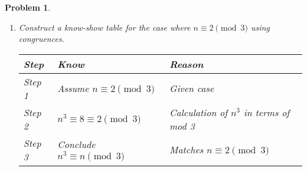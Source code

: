 \documentclass[12pt]{article}
\newtheorem{problem}{Problem}
\theoremstyle{definition}
\begin{document}
\begin{problem}
\begin{enumerate}[label=(\alph*)]
    \item Construct a know-show table for the case where \( n \equiv 2 \pmod{3} \) using congruences.
    
    \begin{center}
        \begin{tabular}{|p{}|p{}|p{}|}
        \hline
        \textbf{Step} & \textbf{Know} & \textbf{Reason} \\
        \hline
        Step 1 & Assume \( n \equiv 2 \pmod{3} \) & Given case \\
        \hline
        Step 2 & \( n^3 \equiv 8 \equiv 2 \pmod{3} \) & Calculation of \( n^3 \) in terms of mod 3 \\
        \hline
        Step 3 & Conclude \( n^3 \equiv n \pmod{3} \) & Matches \( n \equiv 2 \pmod{3} \) \\
        \hline
        \end{tabular}
    \end{center}
\end{enumerate}
\end{problem}

\bigskip
\end{document}
